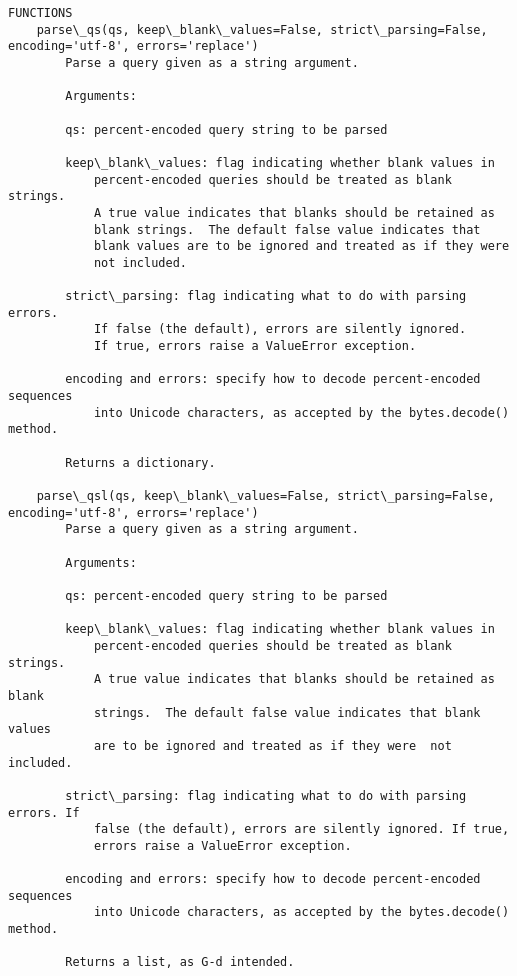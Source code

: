 \documentclass[11pt]{article}
\begin{document}
\begin{Verbatim}[commandchars=\\\{\}]
FUNCTIONS
    parse\_qs(qs, keep\_blank\_values=False, strict\_parsing=False, encoding='utf-8', errors='replace')
        Parse a query given as a string argument.
        
        Arguments:
        
        qs: percent-encoded query string to be parsed
        
        keep\_blank\_values: flag indicating whether blank values in
            percent-encoded queries should be treated as blank strings.
            A true value indicates that blanks should be retained as
            blank strings.  The default false value indicates that
            blank values are to be ignored and treated as if they were
            not included.
        
        strict\_parsing: flag indicating what to do with parsing errors.
            If false (the default), errors are silently ignored.
            If true, errors raise a ValueError exception.
        
        encoding and errors: specify how to decode percent-encoded sequences
            into Unicode characters, as accepted by the bytes.decode() method.
        
        Returns a dictionary.
    
    parse\_qsl(qs, keep\_blank\_values=False, strict\_parsing=False, encoding='utf-8', errors='replace')
        Parse a query given as a string argument.
        
        Arguments:
        
        qs: percent-encoded query string to be parsed
        
        keep\_blank\_values: flag indicating whether blank values in
            percent-encoded queries should be treated as blank strings.
            A true value indicates that blanks should be retained as blank
            strings.  The default false value indicates that blank values
            are to be ignored and treated as if they were  not included.
        
        strict\_parsing: flag indicating what to do with parsing errors. If
            false (the default), errors are silently ignored. If true,
            errors raise a ValueError exception.
        
        encoding and errors: specify how to decode percent-encoded sequences
            into Unicode characters, as accepted by the bytes.decode() method.
        
        Returns a list, as G-d intended.
    

\end{Verbatim}
\end{document}

